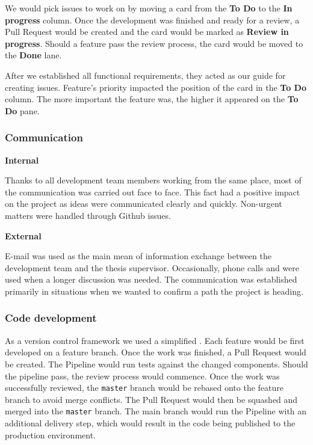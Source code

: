 We would pick issues to work on by moving a card from the \textbf{To Do} to the \textbf{In progress} column. Once the development was finished and ready for a review, a Pull Request would be created and the card would be marked as \textbf{Review in progress}. Should a feature pass the review process, the card would be moved to the \textbf{Done} lane.

\medskip 

After we established all functional requirements, they acted as our guide for creating issues. Feature's priority impacted the position of the card in the \textbf{To Do} column. The more important the feature was, the higher it appeared on the \textbf{To Do} pane.

\subsubsection{Communication}

\textbf{Internal}

Thanks to all development team members working from the same place, most of the communication was carried out face to face. This fact had a positive impact on the project as ideas were communicated clearly and quickly. Non-urgent matters were handled through Github issues.

\medskip

\textbf{External}

E-mail was used as the main mean of information exchange between the development team and the thesis supervisor. Occasionally, phone calls and  were used when a longer discussion was needed. The communication was established primarily in situations when we wanted to confirm a path the project is heading.


\subsubsection{Code development}

As a version control framework we used a simplified . Each feature would be first developed on a feature branch. Once the work was finished, a Pull Request would be created. The Pipeline would run tests against the changed components. Should the pipeline pass, the review process would commence. Once the work was successfully reviewed, the \texttt{master} branch would be rebased onto the feature branch to avoid merge conflicts. The Pull Request would then be squashed and merged into the \texttt{master} branch. The main branch would run the Pipeline with an additional delivery step, which would result in the code being published to the production environment.




